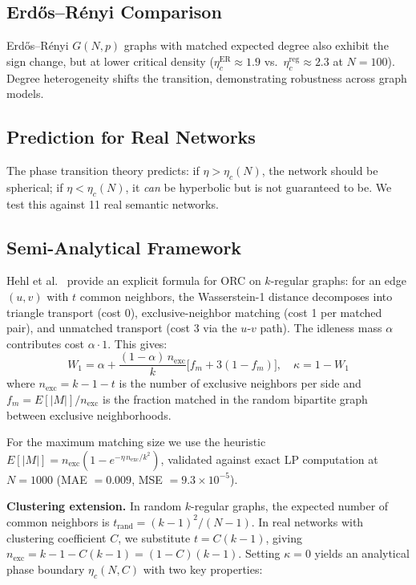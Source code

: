 \documentclass[11pt,a4paper]{article}
\newcommand{\etac}{\eta_c}
\begin{document}
\subsection{Erd\H{o}s--R\'enyi Comparison}

Erd\H{o}s--R\'enyi $G(N,p)$ graphs with matched expected degree also exhibit the sign change, but at lower critical density ($\etac^{\mathrm{ER}} \approx 1.9$ vs.\ $\etac^{\mathrm{reg}} \approx 2.3$ at $N = 100$). Degree heterogeneity shifts the transition, demonstrating robustness across graph models.

\subsection{Prediction for Real Networks}

The phase transition theory predicts: if $\eta > \etac(N)$, the network should be spherical; if $\eta < \etac(N)$, it \emph{can} be hyperbolic but is not guaranteed to be. We test this against 11 real semantic networks.

\subsection{Semi-Analytical Framework}
\label{sec:analytical}

Hehl et al.~\cite{hehl2024curvature} provide an explicit formula for ORC on $k$-regular graphs: for an edge $(u,v)$ with $t$ common neighbors, the Wasserstein-1 distance decomposes into triangle transport (cost 0), exclusive-neighbor matching (cost 1 per matched pair), and unmatched transport (cost 3 via the $u$-$v$ path). The idleness mass $\alpha$ contributes cost $\alpha \cdot 1$. This gives:
\begin{equation}
    W_1 = \alpha + \frac{(1-\alpha)\,n_{\mathrm{exc}}}{k}\bigl[f_m + 3(1 - f_m)\bigr], \quad \kappa = 1 - W_1
    \label{eq:hehl}
\end{equation}
where $n_{\mathrm{exc}} = k - 1 - t$ is the number of exclusive neighbors per side and $f_m = E[|M|]/n_{\mathrm{exc}}$ is the fraction matched in the random bipartite graph between exclusive neighborhoods.

For the maximum matching size we use the heuristic $E[|M|] = n_{\mathrm{exc}}(1 - e^{-\eta\,n_{\mathrm{exc}}/k^2})$, validated against exact LP computation at $N = 1000$ (MAE $= 0.009$, MSE $= 9.3 \times 10^{-5}$).

\textbf{Clustering extension.} In random $k$-regular graphs, the expected number of common neighbors is $t_{\mathrm{rand}} = (k-1)^2/(N-1)$. In real networks with clustering coefficient $C$, we substitute $t = C(k-1)$, giving $n_{\mathrm{exc}} = k - 1 - C(k-1) = (1-C)(k-1)$. Setting $\kappa = 0$ yields an analytical phase boundary $\etac(N, C)$ with two key properties:
\end{document}
